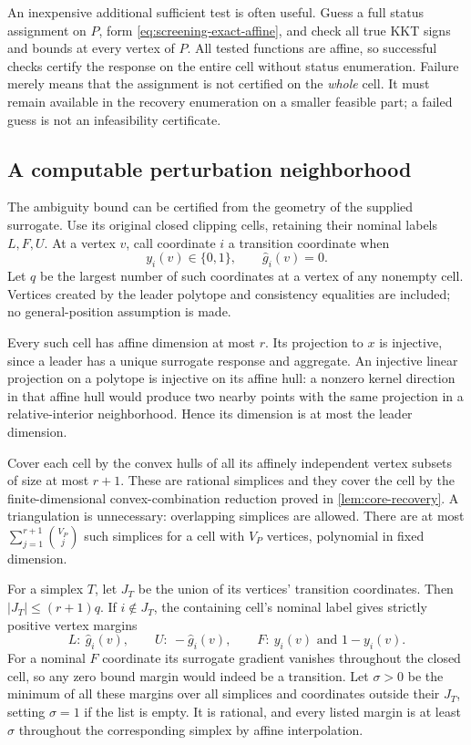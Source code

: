 An inexpensive additional sufficient test is often useful. Guess a full
status assignment on $P$, form \eqref{eq:screening-exact-affine}, and
check all true KKT signs and bounds at every vertex of $P$. All tested
functions are affine, so successful checks certify the response on the
entire cell without status enumeration. Failure merely means that the
assignment is not certified on the \emph{whole} cell. It must remain
available in the recovery enumeration on a smaller feasible part; a
failed guess is not an infeasibility certificate.

\subsection{A computable perturbation neighborhood}\label{subsec:screening-neighborhood}

The ambiguity bound can be certified from the geometry of the supplied
surrogate. Use its original closed clipping cells, retaining their
nominal labels $L,F,U$. At a vertex $v$, call coordinate $i$ a transition
coordinate when
\[
                    y_i(v)\in\{0,1\},\qquad\widehat g_i(v)=0.
\]
Let $q$ be the largest number of such coordinates at a vertex of any
nonempty cell. Vertices created by the leader polytope and consistency
equalities are included; no general-position assumption is made.

Every such cell has affine dimension at most $r$. Its projection to $x$
is injective, since a leader has a unique surrogate response and aggregate.
An injective linear projection on a polytope is injective on its affine
hull: a nonzero kernel direction in that affine hull would produce two
nearby points with the same projection in a relative-interior neighborhood.
Hence its dimension is at most the leader dimension.

Cover each cell by the convex hulls of all its affinely independent vertex
subsets of size at most $r+1$. These are rational simplices and they cover
the cell by the finite-dimensional convex-combination reduction proved
in \cref{lem:core-recovery}. A triangulation is unnecessary: overlapping
simplices are allowed. There are at most
$\sum_{j=1}^{r+1}\binom{V_P}{j}$ such simplices for a cell with $V_P$
vertices, polynomial in fixed dimension.

For a simplex $T$, let $J_T$ be the union of its vertices' transition
coordinates. Then $|J_T|\le(r+1)q$. If $i\notin J_T$, the containing
cell's nominal label gives strictly positive vertex margins
\[
 L:\ \widehat g_i(v),\qquad U:\ -\widehat g_i(v),\qquad
 F:\ y_i(v)\text{ and }1-y_i(v).
\]
For a nominal $F$ coordinate its surrogate gradient vanishes throughout
the closed cell, so any zero bound margin would indeed be a transition.
Let $\sigma>0$ be the minimum of all these margins over all simplices
and coordinates outside their $J_T$, setting $\sigma=1$ if the list
is empty. It is rational, and every listed margin is at least $\sigma$
throughout the corresponding simplex by affine interpolation.

